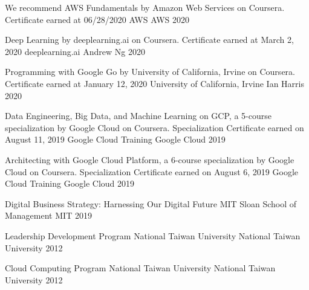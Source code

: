 

\begin{cvhonors}

  \cvhonor
    {We recommend AWS Fundamentals by Amazon Web Services on Coursera. Certificate earned at 06/28/2020} %
    {AWS} %
    {AWS} %
    {2020} %

  \cvhonor
    {Deep Learning by deeplearning.ai on Coursera. Certificate earned at March 2, 2020} %
    {deeplearning.ai} %
    {Andrew Ng} %
    {2020} %

  \cvhonor
    {Programming with Google Go by University of California, Irvine on Coursera. Certificate earned at January 12, 2020} %
    {University of California, Irvine} %
    {Ian Harris} %
    {2020} %

  \cvhonor
    {Data Engineering, Big Data, and Machine Learning on GCP, a 5-course specialization by Google Cloud on Coursera. Specialization Certificate earned on August 11, 2019} %
    {Google Cloud Training} %
    {Google Cloud} %
    {2019} %

  \cvhonor
    {Architecting with Google Cloud Platform, a 6-course specialization by Google Cloud on Coursera. Specialization Certificate earned on August 6, 2019} %
    {Google Cloud Training} %
    {Google Cloud} %
    {2019} %

  \cvhonor
    {Digital Business Strategy: Harnessing Our Digital Future} %
    {MIT Sloan School of Management} %
    {MIT} %
    {2019} %

  \cvhonor
    {Leadership Development Program} %
    {National Taiwan University} %
    {National Taiwan University} %
    {2012} %

  \cvhonor
    {Cloud Computing Program} %
    {National Taiwan University} %
    {National Taiwan University} %
    {2012} %

\end{cvhonors}
